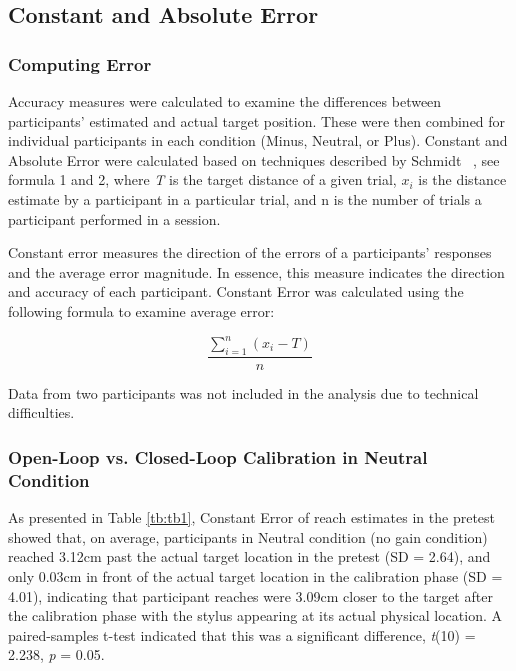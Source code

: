 

\subsection{Constant and Absolute Error}

\subsubsection{Computing Error}
Accuracy measures were calculated to examine the differences between participants' estimated and actual target position. These were then combined for individual participants in each condition (Minus, Neutral, or Plus). Constant and Absolute Error were calculated based on techniques described by Schmidt ~\cite{SL88}, see formula 1 and 2, where \textit{T} is the target distance of a given trial, $x_i$ is the distance estimate by a participant in a particular trial, and n is the number of trials a participant performed in a session.

Constant error measures the direction of the errors of a participants' responses and the average error magnitude. In essence, this measure indicates the direction and accuracy of each participant. Constant Error was calculated using the following formula to examine average error:

\begin{equation}
\frac{\sum^{n}_{i=1}(x_i-T)}{n}
\end{equation}

Data from two participants was not included in the analysis due to technical difficulties.

\subsubsection{Open-Loop vs. Closed-Loop Calibration in Neutral Condition}

As presented in Table \ref{tb:tb1}, Constant Error of reach estimates in the pretest showed that, on average, participants in Neutral condition (no gain condition) reached 3.12cm past the actual target location in the pretest (SD = 2.64), and only 0.03cm in front of the actual target location in the calibration phase (SD = 4.01), indicating that participant reaches were 3.09cm closer to the target after the calibration phase with the stylus appearing at its actual physical location. A paired-samples t-test indicated that this was a significant difference, \textit{t}(10) = 2.238, \textit{p} = 0.05.

